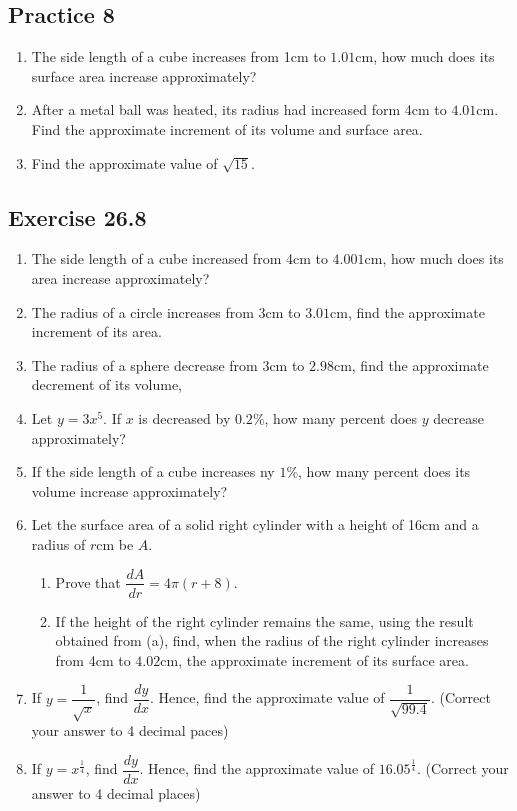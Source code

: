 \documentclass{report}
\begin{document}
\subsection{Practice 8}

\begin{enumerate}
    \item The side length of a cube increases from 1cm to $1.01$cm, how much does its
          surface area increase approximately?
    \item After a metal ball was heated, its radius had increased form 4cm to $4.01$cm.
          Find the approximate increment of its volume and surface area.
    \item Find the approximate value of $\sqrt{15}$.
\end{enumerate}

\subsection{Exercise 26.8}
\begin{enumerate}
    \item The side length of a cube increased from 4cm to $4.001$cm, how much does its
          area increase approximately?
    \item The radius of a circle increases from 3cm to $3.01$cm, find the approximate
          increment of its area.
    \item The radius of a sphere decrease from 3cm to $2.98$cm, find the approximate
          decrement of its volume,
    \item Let $y = 3x^5$. If $x$ is decreased by $0.2\%$, how many percent does $y$
          decrease approximately?
    \item If the side length of a cube increases ny $1\%$, how many percent does its
          volume increase approximately?
    \item Let the surface area of a solid right cylinder with a height of 16cm and a
          radius of $r$cm be $A$.
          \begin{enumerate}
              \item Prove that $\dfrac{dA}{dr} = 4\pi(r+8)$.
              \item If the height of the right cylinder remains the same, using the result obtained
                    from (a), find, when the radius of the right cylinder increases from 4cm to
                    $4.02$cm, the approximate increment of its surface area.
          \end{enumerate}
    \item If $y = \dfrac{1}{\sqrt{x}}$, find $\dfrac{dy}{dx}$. Hence, find the
          approximate value of $\dfrac{1}{\sqrt{99.4}}$. (Correct your answer to 4
          decimal paces)
    \item If $y = x^{\frac{1}{4}}$, find $\dfrac{dy}{dx}$. Hence, find the approximate
          value of $16.05^{\frac{1}{4}}$. (Correct your answer to 4 decimal places)
\end{enumerate}
\end{document}
